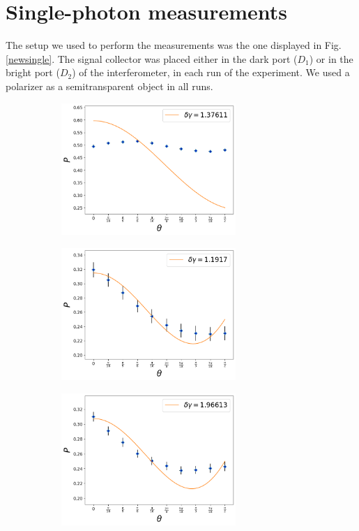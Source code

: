 \documentclass[12pt]{book}
\begin{document}
\section{Single-photon measurements}

The setup we used to perform the measurements was the one displayed in Fig. \ref{newsingle}. The signal collector was placed either in the dark port ($D_{1}$) or in the bright port ($D_{2}$) of the interferometer, in each   run of the experiment. We used a polarizer as a semitransparent object in all runs.

\begin{figure}[t!]
\centering
\begin{subfigure}[b]{0.45\linewidth}
\includegraphics[width=\linewidth,height=5cm]{images/ajuste_miercoles_11.png}
\caption{}
\end{subfigure}
\begin{subfigure}[b]{0.45\linewidth}
\includegraphics[width=\linewidth,height=5cm]{images/ajuste_miercoles_21.png}
\caption{}
\end{subfigure}
\begin{subfigure}[b]{0.45\linewidth}
\includegraphics[width=\linewidth,height=5cm]{images/ajuste_miercoles_12.png}

\end{subfigure}
\end{figure}
\end{document}
